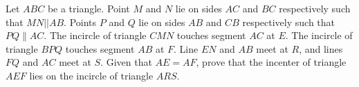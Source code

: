Let $ABC$ be a triangle. Point $M$ and $N$ lie on sides $AC$ and $BC$ respectively such that $MN || AB$. Points $P$ and $Q$ lie on sides $AB$ and $CB$ respectively such that $PQ\parallel AC$. The incircle of triangle $CMN$ touches segment $AC$ at $E$. The incircle of triangle $BPQ$ touches segment $AB$ at $F$. Line $EN$ and $AB$ meet at $R$, and lines $FQ$ and $AC$ meet at $S$. Given that $AE = AF$, prove that the incenter of triangle $AEF$ lies on the incircle of triangle $ARS$.
